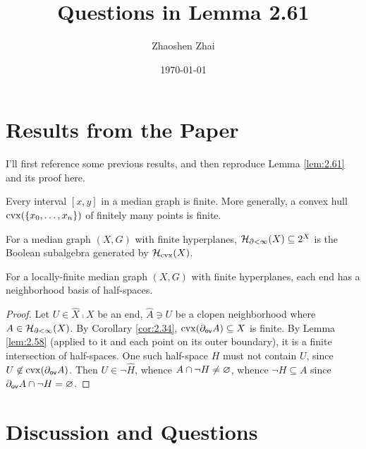 \documentclass{amsart}
\begin{document}
    \title{Questions in Lemma 2.61}
    \author{Zhaoshen Zhai}
    \date{\today}
    \maketitle

    \section{Results from the Paper}

    \setcounter{section}{2}
    I'll first reference some previous results, and then reproduce Lemma \ref{lem:2.61} and its proof here.

    \setcounter{theorem}{33}
    \begin{corollary}\label{cor:2.34}
        Every interval $[x,y]$ in a median graph is finite. More generally, a convex hull $\cvx(\l\{x_0,\dots,x_n\r\})$ of finitely many points is finite.
    \end{corollary}

    \setcounter{theorem}{57}
    \begin{lemma}\label{lem:2.58}
        For a median graph $(X,G)$ with finite hyperplanes, $\mc{H}_{\del<\infty}(X)\subseteq2^X$ is the Boolean subalgebra generated by $\mc{H}_\textrm{cvx}(X)$.
    \end{lemma}

    \setcounter{theorem}{60}
    \begin{lemma}\label{lem:2.61}
        For a locally-finite median graph $(X,G)$ with finite hyperplanes, each end has a neighborhood basis of half-spaces.
    \end{lemma}
    \begin{proof}
        Let $U\in\widehat{X}\comp X$ be an end, $\widehat{A}\ni U$ be a clopen neighborhood where $A\in\mc{H}_{\del<\infty}(X)$. By Corollary \ref{cor:2.34}, $\cvx(\del_\sf{ov}A)\subseteq X$ is finite. By Lemma \ref{lem:2.58} (applied to it and each point on its outer boundary), it is a finite intersection of half-spaces. One such half-space $H$ must not contain $U$, since $U\not\in\cvx(\del_\sf{ov}A)$. Then $U\in\lnot\widehat{H}$, whence $A\cap\lnot H\neq\em$, whence $\lnot H\subseteq A$ since $\del_\sf{ov}A\cap\lnot H=\em$.
    \end{proof}

    \setcounter{section}{1}
    \section{Discussion and Questions}
\end{document}
